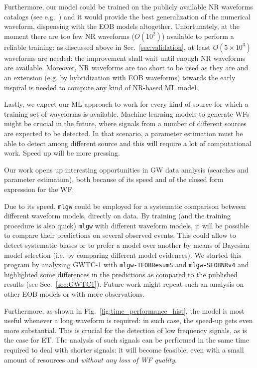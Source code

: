 \documentclass[twocolumn,showpacs,preprintnumbers,nofootinbib,prd,
superscriptaddress,10pt]{revtex4-1}
\begin{document}
Furthermore, our model could be trained on the publicly available NR waveforms 
catalogs (see e.g.~\cite{Mroue:2013xna,Boyle:2019kee,Healy:2019jyf}) and it would provide the best generalization of 
the numerical waveform, dispensing with the EOB models altogether.
Unfortunately, at the moment there are too few NR waveforms ($O(10^2)$) available to perform a reliable 
training: as discussed above in Sec.~\ref{sec:validation}, at least $O(5\times 10^3)$ waveforms are needed:
the improvement shall wait until enough NR waveforms are available.
Moreover, NR waveforms are too short to be used as they are and an extension (e.g. by hybridization with EOB waveforms)
towards the early inspiral is needed to compute any kind of NR-based ML model.

Lastly, we expect our ML approach to work for every kind of source for which a training set of 
waveforms is available. Machine learning models to generate WFs might be crucial in 
the future, where signals from a number of different sources are expected to be detected. In that scenario, 
a parameter estimation must be able to detect among different source and this will require a lot 
of computational work. Speed up will be more pressing.


Our work opens up interesting opportunities in GW data analysis (searches and parameter estimation), 
both because of its speed and of the closed form expression for the WF.

Due to its speed, \texttt{mlgw} could be employed for a systematic comparison between different waveform models, directly on data.
By training (and the training procedure is also quick) \texttt{mlgw} with different waveform models, it will be possible to compare their predictions on several observed events. This could allow to detect systematic biases or to prefer a model over another by means of Bayesian model selection (i.e. by comparing different model evidences).
We started this program by analyzing GWTC-1 with \texttt{mlgw-TEOBResumS} and \texttt{mlgw-SEOBNRv4} and 
highlighted some differences in the predictions as compared to the published results (see Sec.~\ref{sec:GWTC1}). 
Future work might repeat such an analysis on other EOB models or with more observations.

Furthermore, as shown in Fig.~\ref{fig:time_performance_hist}, the model is most useful whenever a long 
waveform is required: in such case, the speed-up gets even more substantial. This is crucial for the detection 
of low frequency signals, as is the case for ET. The analysis of such signals can be performed in the same time 
required to deal with shorter signals: it will become feasible, even with a small amount of resources and 
\textit{without any loss of WF quality}.
\end{document}
